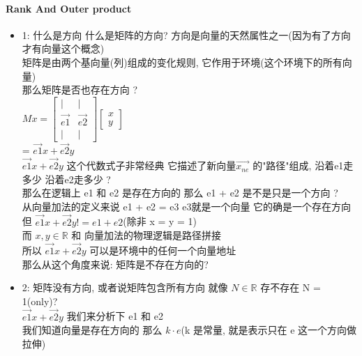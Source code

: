 \documentclass[12pt]{article}
\begin{document}
\paragraph{Rank And Outer product}
\begin{flushleft}
    \begin{itemize}
        \item 1: 什么是方向 什么是矩阵的方向?
              方向是向量的天然属性之一(因为有了方向 才有向量这个概念) \\
              矩阵是由两个基向量(列)组成的变化规则, 它作用于环境(这个环境下的所有向量) \\
              那么矩阵是否也存在方向 ? \\
              $Mx  =  \begin{bmatrix}
                      \vert    & \vert    \\
                      \vec{e1} & \vec{e2} \\
                      \vert    & \vert
                  \end{bmatrix}\begin{bmatrix}
                      x \\
                      y
                  \end{bmatrix}$ \\
              = $\vec{e1}x  + \vec{e2}y$ \\
              $\vec{e1}x  + \vec{e2}y$ 这个代数式子非常经典 它描述了新向量$\vec{x_{ne}}$ 的"路径"组成, 沿着e1走多少 沿着e2走多少 ? \\
              那么在逻辑上 e1 和 e2 是存在方向的 那么 e1 + e2 是不是只是一个方向 ?  \\
              从向量加法的定义来说 e1 + e2 = e3 e3就是一个向量 它的确是一个存在方向 \\
              但 $\vec{e1}x  + \vec{e2}y != e1 + e2$(除非 x = y = 1) \\
              而 $x,y ∈ \mathbb{R}$ 和 向量加法的物理逻辑是路径拼接 \\
              所以 $\vec{e1}x  + \vec{e2}y$ 可以是环境中的任何一个向量地址 \\
              那么从这个角度来说: 矩阵是不存在方向的? \\
        \item 2: 矩阵没有方向, 或者说矩阵包含所有方向 就像 $N ∈ \mathbb{R}$ 存不存在 N = 1(only)? \\
              $\vec{e1}x  + \vec{e2}y$ 我们来分析下 e1 和 e2 \\
              我们知道向量是存在方向的 那么 $k \cdot e$(k 是常量, 就是表示只在 e 这一个方向做拉伸)\\

\end{itemize}
\end{flushleft}
\end{document}
